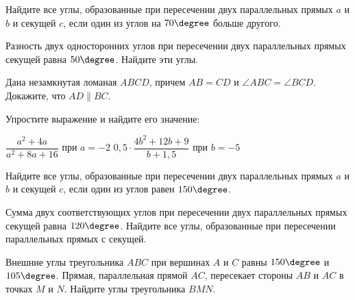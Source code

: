 \begin{class}[number=4]
	\begin{listofex}
		\item Найдите все углы, образованные при пересечении двух параллельных прямых \(a\) и \(b\) и секущей \(c\), если один из углов на \(70 \degree\) больше другого. %
		\item Разность двух односторонних углов при пересечении двух параллельных прямых секущей равна \(50 \degree\). Найдите эти углы.
		\item Дана незамкнутая ломаная \(ABCD\), причем \(AB = CD\) и \(\angle ABC = \angle BCD \). Докажите, что \(AD \parallel BC\).
		\item Упростите выражение и найдите его значение:
		\begin{tasks}
			\task \( \dfrac{a^2+4a}{a^2+8a+16} \) при \(a=-2\)
			\task \( 0,5 \cdot \dfrac{4b^2+12b+9}{b+1,5} \) при \(b=-5\)
		\end{tasks}
	\end{listofex}
\end{class}

\begin{homework}[number=2]
	\begin{listofex}
		\item Найдите все углы, образованные при пересечении двух параллельных прямых \(a\) и \(b\) и секущей \(c\), если один из углов равен \(150 \degree\). %
		\item Сумма двух соответствующих углов при пересечении двух параллельных прямых секущей равна \(120 \degree\). Найдите все углы, образованные при пересечении параллельных прямых с секущей.
		\item Внешние углы треугольника \(ABC\) при вершинах \(A\) и \(C\) равны \(150\degree\) и \(105\degree \). Прямая, параллельная прямой \(AC\), пересекает стороны \(AB\) и \(AC\) в точках \(M\) и \(N\). Найдите углы треугольника \(BMN\).
	\end{listofex}
\end{homework}

